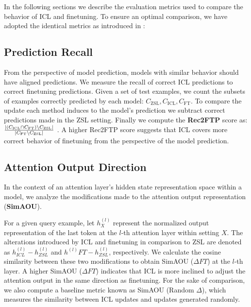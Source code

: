In the following sections we describe the evaluation metrics used to compare the behavior of ICL and finetuning.
To ensure an optimal comparison, we have adopted the identical metrics as introduced in \cite{dai2023gpt}:

\subsection*{Prediction Recall}

From the perspective of model prediction, models with similar behavior should have aligned predictions.
We measure the recall of correct ICL predictions to correct finetuning predictions.
Given a set of test examples, we count the subsets of examples correctly predicted by each model: $C_{\text{ZSL}}, C_{\text{ICL}}, C_{\text{FT}}$.
To compare the update each method induces to the model's prediction we subtract correct predictions made in the ZSL setting.
Finally we compute the \textbf{Rec2FTP} score as: $\frac{ \left| \left( C_{\text{ICL}} \cap C_{\text{FT}} \right) \setminus C_{\text{ZSL}} \right| }{ \left| C_{\text{FT}} \setminus C_{\text{ZSL}} \right| }$ .
A higher Rec2FTP score suggests that ICL covers more correct behavior of finetuning from the perspective of the model prediction.


\subsection*{Attention Output Direction}
In the context of an attention layer's hidden state representation space within a model, we analyze the modifications made to the attention output representation (\textbf{SimAOU}).

For a given query example, let $h^{(l)}_X$ represent the normalized output representation of the last token at the $l$-th attention layer within setting $X$. The alterations introduced by ICL and finetuning in comparison to ZSL are denoted as $h^{(l)}_{ICL} - h^{(l)}_{ZSL}$ and $h^{(l)}{FT} - h^{(l)}_{ZSL}$, respectively. We calculate the cosine similarity between these two modifications to obtain SimAOU ($\Delta FT$) at the $l$-th layer. A higher SimAOU ($\Delta FT$) indicates that ICL is more inclined to adjust the attention output in the same direction as finetuning.
For the sake of comparison, we also compute a baseline metric known as SimAOU (Random $\Delta$), which measures the similarity between ICL updates and updates generated randomly.

